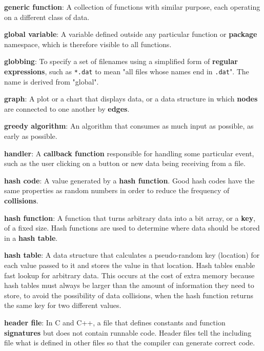 \documentclass[krantzl]{krantz}
\newcommand{\glosskey}[1]{\textbf{#1}}
\begin{document}
\noindent \textbf{\glosskey{generic function}}: 
A collection of functions with similar purpose, each operating on a different class of data.


\noindent \textbf{\glosskey{global variable}}: 
A variable defined outside any particular function or \glosskey{package} namespace, which is therefore visible to all functions.


\noindent \textbf{\glosskey{globbing}}: 
To specify a set of filenames using a simplified form of \glosskey{regular expressions}, such as \texttt{*.dat} to mean "all files whose names end in \texttt{.dat}". The name is derived from "global".


\noindent \textbf{\glosskey{graph}}: 
A plot or a chart that displays data, or a data structure in which \glosskey{nodes} are connected to one another by \glosskey{edges}.


\noindent \textbf{\glosskey{greedy algorithm}}: 
An algorithm that consumes as much input as possible, as early as possible.


\noindent \textbf{\glosskey{handler}}: 
A \glosskey{callback function} responsible for handling some particular event, such as the user clicking on a button or new data being receiving from a file.


\noindent \textbf{\glosskey{hash code}}: 
A value generated by a \glosskey{hash function}. Good hash codes have the same properties as random numbers in order to reduce the frequency of \glosskey{collisions}.


\noindent \textbf{\glosskey{hash function}}: 
A function that turns arbitrary data into a bit array, or a \glosskey{key}, of a fixed size. Hash functions are used to determine where data should be stored in a \glosskey{hash table}.


\noindent \textbf{\glosskey{hash table}}: 
A data structure that calculates a pseudo-random key (location) for each value passed to it and stores the value in that location. Hash tables enable fast lookup for arbitrary data. This occurs at the cost of extra memory because hash tables must always be larger than the amount of information they need to store, to avoid the possibility of data collisions, when the hash function returns the same key for two different values.


\noindent \textbf{\glosskey{header file}}: 
In C and C++, a file that defines constants and function \glosskey{signatures} but does not contain runnable code. Header files tell the including file what is defined in other files so that the compiler can generate correct code.
\end{document}
